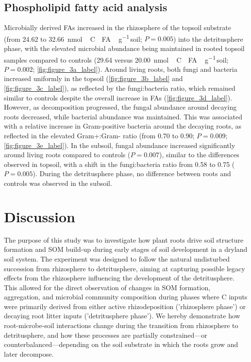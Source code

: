 \subsection{Phospholipid fatty acid analysis}

Microbially derived FAs increased in the rhizosphere of the topsoil substrate (from \num{24.62} to \SI{32.66}{nmol\,C\text{-}FA\,\gram^{-1}}\,soil; \(P=0.005\)) into the detritusphere phase, with the elevated microbial abundance being maintained in rooted topsoil samples compared to controls (\num{29.64} versus \SI{20.00}{nmol\,C\text{-}FA\,\gram^{-1}}\,soil; \(P=0.002\); \cref{fig:figure_3a_label}). Around living roots, both fungi and bacteria increased uniformly in the topsoil (\cref{fig:figure_3b_label} and \cref{fig:figure_3c_label}), as reflected by the fungi:bacteria ratio, which remained similar to controls despite the overall increase in FAs (\cref{fig:figure_3d_label}). However, as decomposition progressed, the fungal abundance around decaying roots decreased, while bacterial abundance was maintained. This was associated with a relative increase in Gram-positive bacteria around the decaying roots, as reflected in the elevated Gram+:Gram- ratio (from \num{0.70} to \num{0.90}; \(P=0.009\); \cref{fig:figure_3e_label}). In the subsoil, fungal abundance increased significantly around living roots compared to controls (\(P=0.007\)), similar to the differences observed in topsoil, with a shift in the fungi:bacteria ratio from \num{0.58} to \num{0.75} (\(P=0.005\)). During the detritusphere phase, no difference between roots and controls was observed in the subsoil.

\section{Discussion}

The purpose of this study was to investigate how plant roots drive soil structure formation and SOM build-up during early stages of soil development in a dryland soil system. The experiment was designed to follow the natural undisturbed succession from rhizosphere to detritusphere, aiming at capturing possible legacy effects from the rhizosphere influencing the development of the detritusphere. This allowed for the direct observation of changes in SOM formation, aggregation, and microbial community composition during phases where C inputs were primarily derived from either active rhizodeposition ('rhizosphere phase') or decaying root litter inputs ('detritusphere phase'). We hereby demonstrate how root-microbe-soil interactions change during the transition from rhizosphere to detritusphere, and how these processes are partially constrained—or counterbalanced—depending on the soil substrate in which the roots grow and later decompose.

